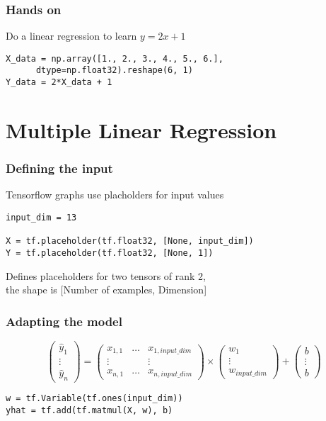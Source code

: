 \documentclass{beamer}
\begin{document}
\begin{frame}[fragile]
\frametitle{Hands on}

Do a linear regression to learn $y = 2x + 1$

\begin{lstlisting}
X_data = np.array([1., 2., 3., 4., 5., 6.],
      dtype=np.float32).reshape(6, 1)
Y_data = 2*X_data + 1
\end{lstlisting}
\end{frame}


\section{Multiple Linear Regression}

\begin{frame}[fragile]
\frametitle{Defining the input}

Tensorflow graphs use placholders for input values

\begin{lstlisting}
input_dim = 13

X = tf.placeholder(tf.float32, [None, input_dim])
Y = tf.placeholder(tf.float32, [None, 1])
\end{lstlisting}

Defines placeholders for two tensors of rank 2,\\
the shape is [Number of examples, Dimension]
\end{frame}

\begin{frame}[fragile]
\frametitle{Adapting the model}

\begin{displaymath}
  \begin{pmatrix} \hat{y}_1\\\vdots\\\hat{y}_n\end{pmatrix} =
  \begin{pmatrix} x_{1,1} & \hdots & x_{1,input\_dim}\\\vdots && \vdots\\x_{n,1} & \hdots & x_{n,input\_dim}\end{pmatrix} \times
  \begin{pmatrix} w_1 \\\vdots\\w_{input\_dim}\end{pmatrix} +
  \begin{pmatrix} b\\\vdots\\b\end{pmatrix}
\end{displaymath}

\begin{lstlisting}
w = tf.Variable(tf.ones(input_dim))
yhat = tf.add(tf.matmul(X, w), b)
\end{lstlisting}
\end{frame}
\end{document}
